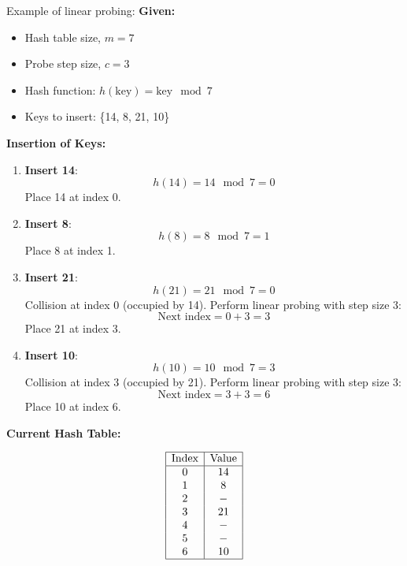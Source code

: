 \begin{example}
    Example of linear probing:
    \textbf{Given:}
    \begin{itemize}
        \item Hash table size, $m = 7$
        \item Probe step size, $c = 3$
        \item Hash function: $h(\text{key}) = \text{key} \mod 7$
        \item Keys to insert: \{14, 8, 21, 10\}
    \end{itemize}
    
    \textbf{Insertion of Keys:}
    \begin{enumerate}
        \item \textbf{Insert 14}:
           \[
           h(14) = 14 \mod 7 = 0
           \]
           Place 14 at index 0.
    
        \item \textbf{Insert 8}:
           \[
           h(8) = 8 \mod 7 = 1
           \]
           Place 8 at index 1.
    
        \item \textbf{Insert 21}:
           \[
           h(21) = 21 \mod 7 = 0
           \]
           Collision at index 0 (occupied by 14).  
           Perform linear probing with step size 3:
           \[
           \text{Next index} = 0 + 3 = 3
           \]
           Place 21 at index 3.
    
        \item \textbf{Insert 10}:
           \[
           h(10) = 10 \mod 7 = 3
           \]
           Collision at index 3 (occupied by 21).  
           Perform linear probing with step size 3:
           \[
           \text{Next index} = 3 + 3 = 6
           \]
           Place 10 at index 6.
    \end{enumerate}
    
    \textbf{Current Hash Table:}
    
    \[
    \begin{array}{|c|c|}
    \hline
    \text{Index} & \text{Value} \\
    \hline
    0 & 14 \\
    1 & 8 \\
    2 & - \\
    3 & 21 \\
    4 & - \\
    5 & - \\
    6 & 10 \\
    \hline
    \end{array}
    \]
    

\end{example}

